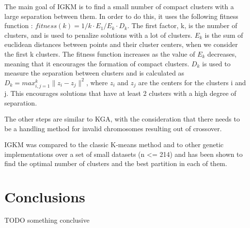 \documentclass[12pt]{article}
\begin{document}
	The main goal of IGKM is to find a small number of compact clusters with a large separation between them. In order to do this, it uses the following fitness function : \(fitness(k) = 1/k \cdot E_1/E_k \cdot D_k \). The first factor, k, is the number of clusters, and is used to penalize solutions with a lot of clusters. \(E_k\) is the sum of euclidean distances between points and their cluster centers, when we consider the first k clusters. The fitness function increases as the value of \(E_k\) decreases, meaning that it encourages the formation of compact clusters. \(D_k\) is used to measure the separation between clusters and is calculated as \(D_k=max_{i,j=1}^k \|z_i - z_j\|^2 \), where \(z_i\) and \(z_j\) are the centers for the clusters i and j. This encourages solutions that have at least 2 clusters with a high degree of separation.
	
	The other steps are similar to KGA\cite{EvolutionaryKMeans}, with the consideration that there needs to be a handling method for invalid chromosomes resulting out of crossover.
	
	IGKM was compared to the classic K-means method and to other genetic implementations over a set of small datasets (n <= 214) and has been shown to find the optimal number of clusters and the best partition in each of them.
	
	\section{Conclusions}
	TODO something conclusive
	
	\newpage
	
	
\end{document}
